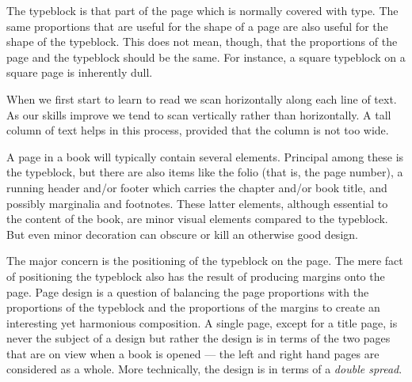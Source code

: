 \documentclass[10pt,a4paper,oneside,extrafontsizes]{memoir}%
\begin{document}
\begin{paracol}{2}
\switchEng
    The typeblock is that part of the page which is normally 
covered with type. The same proportions that are useful for the shape of a 
page are also useful for the shape of the typeblock. This does not mean, 
though, that the proportions of the page and the typeblock should be the same. 
For instance, a square typeblock on a square page is inherently dull.

    When we first start to learn to read we scan horizontally along each line
of text. As our skills improve we tend to scan vertically rather than
horizontally. A tall column of text helps in this process, 
provided that the column is not too wide.

    A page in a book will typically contain several elements. Principal
among these is the typeblock, but there are also items like 
the folio (that is, the page number), 
a running header and/or footer 
which carries the chapter 
and/or book title, and possibly marginalia and 
footnotes. These latter
elements, although essential to the content of the book, are minor visual
elements compared to the typeblock. 
But even minor decoration can obscure
or kill an otherwise good design.

  The major concern is the positioning of the typeblock on the page. 
The mere fact of positioning the typeblock also has 
the result of producing margins onto the page. 
Page design is a question of balancing the page proportions
with the proportions of the typeblock and the proportions 
of the margins to 
create an interesting yet harmonious composition. A single page, except
for a title page, is never the subject of a design but rather the design
is in terms of the two pages that are on view when a book is opened --- the
left and right hand pages are considered as a whole. More technically, the
design is in terms of a \emph{double spread}.
\end{paracol}
\end{document}
